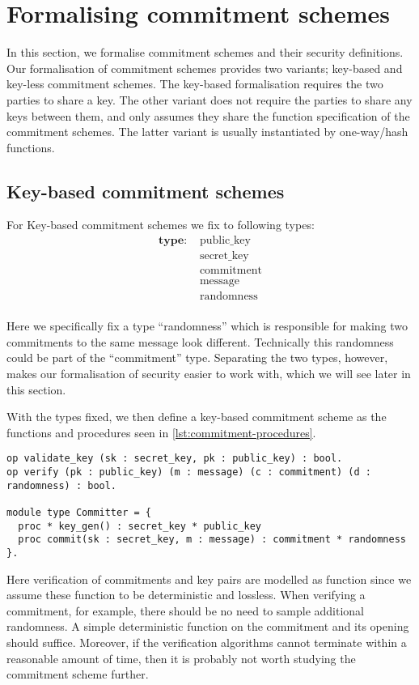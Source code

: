 \chapter{Formalising commitment schemes}
\label{ch:formal_commitment}
In this section, we formalise commitment schemes and their security definitions.
Our formalisation of commitment schemes provides two variants; key-based and
key-less commitment schemes.
The key-based formalisation requires the two parties to share a key.
The other variant does not require the parties to share any keys between them, and
only assumes they share the function specification of the commitment schemes.
The latter variant is usually instantiated by one-way/hash functions.

\section{Key-based commitment schemes}
\label{sec:commitment:key-based}
For Key-based commitment schemes we fix to following types:
\begin{align*}
  \textbf{type: } &\text{public\_key} \\
  &\text{secret\_key} \\
  &\text{commitment} \\
  &\text{message} \\
  &\text{randomness} \\
\end{align*}

Here we specifically fix a type ``randomness'' which is responsible for making two
commitments to the same message look different. Technically this randomness
could be part of the ``commitment'' type.
Separating the two types, however, makes
our formalisation of security easier to work with, which we will see later in
this section.

With the types fixed, we then define a key-based commitment scheme as the
functions and procedures seen in \autoref{lst:commitment-procedures}.

\begin{lstlisting}[float,label=lst:commitment-procedures,caption= Key-Based commitment specification]
op validate_key (sk : secret_key, pk : public_key) : bool.
op verify (pk : public_key) (m : message) (c : commitment) (d : randomness) : bool.

module type Committer = {
  proc * key_gen() : secret_key * public_key
  proc commit(sk : secret_key, m : message) : commitment * randomness
}.
\end{lstlisting}
Here verification of commitments and key pairs are modelled as function since
we assume these function to be deterministic and lossless.
When verifying a commitment, for example, there should be no need to sample
additional randomness. A simple deterministic function on the commitment and its
opening should suffice. Moreover, if the
verification algorithms cannot terminate within a reasonable amount of time,
then it is probably not worth studying the commitment scheme further.

